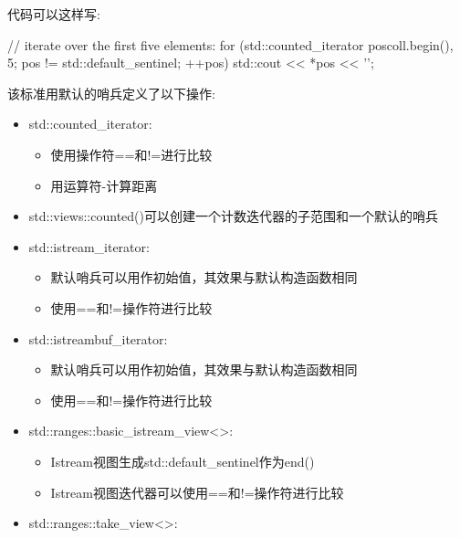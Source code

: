 代码可以这样写:

\begin{cpp}
// iterate over the first five elements:
for (std::counted_iterator pos{coll.begin(), 5};
pos != std::default_sentinel;
++pos) {
	std::cout << *pos << '\n';
}
\end{cpp}

该标准用默认的哨兵定义了以下操作:

\begin{itemize}
\item
std::counted\_iterator:

\begin{itemize}
\item
使用操作符==和!=进行比较

\item
用运算符-计算距离
\end{itemize}

\item
std::views::counted()可以创建一个计数迭代器的子范围和一个默认的哨兵

\item
std::istream\_iterator:

\begin{itemize}
\item
默认哨兵可以用作初始值，其效果与默认构造函数相同

\item
使用==和!=操作符进行比较
\end{itemize}

\item
std::istreambuf\_iterator:

\begin{itemize}
\item
默认哨兵可以用作初始值，其效果与默认构造函数相同

\item
使用==和!=操作符进行比较
\end{itemize}

\item
std::ranges::basic\_istream\_view<>:

\begin{itemize}
\item
Istream视图生成std::default\_sentinel作为end()

\item
Istream视图迭代器可以使用==和!=操作符进行比较
\end{itemize}

\item
std::ranges::take\_view<>:


\end{itemize}
